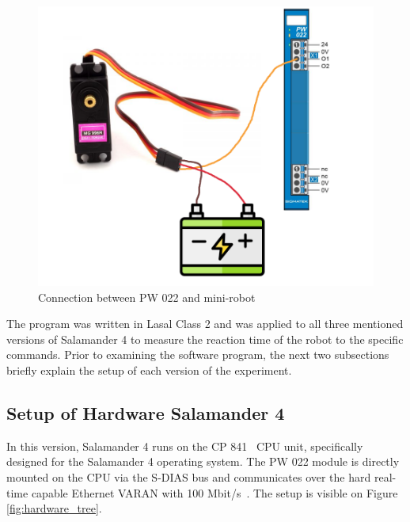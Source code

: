 \documentclass[MMR,Master,english]{twbook}
\begin{document}
\begin{figure}[H]
	\centering
	\includegraphics[width=0.7\columnwidth]{img/experiment/pw022_minirobot.png}
	\caption[Connection between PW 022 and mini-robot]{Connection between PW 022 and mini-robot~\cite{MG996RDigitalServo}}
	\label{fig:pw022_minirobot_connection}
\end{figure}

\noindent The program was written in Lasal Class 2 and was applied to all three mentioned versions of Salamander 4 to measure the reaction time of the robot to the specific commands. Prior to examining the software program, the next two subsections briefly explain the setup of each version of the experiment. 

\subsection{Setup of Hardware Salamander 4}
In this version, Salamander 4 runs on the CP 841~\cite{CPUEinheitenSIGMATEK} CPU unit, specifically designed for the Salamander 4 operating system. The PW 022 module is directly mounted on the CPU via the S-DIAS bus and communicates over the hard real-time capable Ethernet VARAN with 100 Mbit/s~\cite{SDIASSIGMATEK}. The setup is visible on Figure \ref{fig:hardware_tree}.
\end{document}
